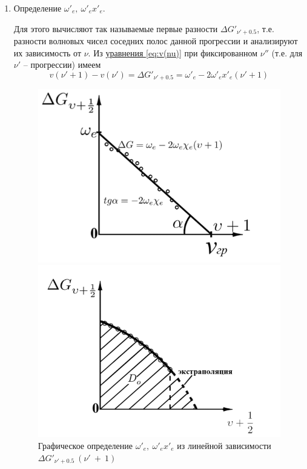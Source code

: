 \documentclass{article}
\begin{document}
\begin{enumerate}
    \item Определение $\omega'_e,~\omega'_e x'_e$. 

    Для этого вычисляют так называемые первые разности $\Delta G'_{\nu'+0.5}$, т.е. разности волновых чисел соседних полос данной прогрессии и анализируют их зависимость от $\nu$. Из
\hyperref[eq:v(nu)]{уравнения \ref*{eq:v(nu)}} при фиксированном $\nu''$ (т.е. для $\nu'$ – прогрессии) имеем
\begin{equation}
\label{eq:G}
    v(\nu'+1)-v(\nu') =  \Delta G'_{\nu'+0.5} = \omega'_e - 2\omega'_e x'_e(\nu'+1)
\end{equation}

\begin{figure}[h]
\begin{center}
\begin{minipage}[h]{0.4\linewidth}
\includegraphics[width=1\linewidth]{Screenshot 2024-02-12 at 11.09.09 AM.png}
\caption{Графическое определение $\omega'_e,~\omega'_e x'_e$ из линейной зависимости $\Delta G'_{\nu'+0.5} ~(\nu'~ +~1)$} %
\label{fig:G(v+1)} %
\end{minipage}
\hfill 
\begin{minipage}[h]{0.4\linewidth}
\includegraphics[width=1\linewidth]{Screenshot 2024-02-12 at 1.01.21 PM.png}

\end{minipage}
\end{center}
\end{figure}
\end{enumerate}
\end{document}
